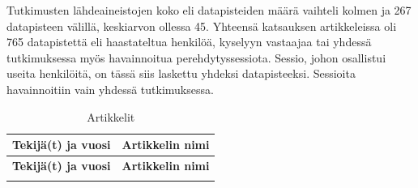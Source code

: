 \documentclass[utf8]{gradu3}
\begin{document}
Tutkimusten lähdeaineistojen koko eli datapisteiden määrä vaihteli kolmen \parencite{kulkarni-ym-2010} ja 267 datapisteen \parencite{rodeghero-ym-2021} välillä, keskiarvon ollessa 45. Yhteensä katsauksen artikkeleissa oli 765 datapistettä eli haastateltua henkilöä, kyselyyn vastaajaa tai yhdessä tutkimuksessa myös havainnoitua perehdytyssessiota. Sessio, johon osallistui useita henkilöitä, on tässä siis laskettu yhdeksi datapisteeksi. Sessioita havainnoitiin vain yhdessä tutkimuksessa. 

\begin{footnotesize}
    \begin{longtable}{ m{4cm}  m{10.5cm} }
    \hline
        \hline
           \textbf{Tekijä(t) ja vuosi} & \textbf{Artikkelin nimi} \\
        \hline
    \endfirsthead

    \hline
        \hline
           \textbf{Tekijä(t) ja vuosi} & \textbf{Artikkelin nimi} \\
        \hline
    \endhead
 \hline
 \endfoot

 \caption{Artikkelit \label{tbl:artikkelit}}
 \endlastfoot


\end{longtable}
\end{footnotesize}
\end{document}
